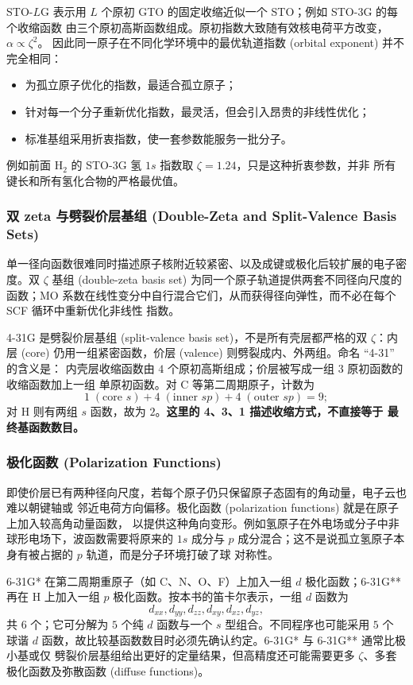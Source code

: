 \documentclass[fontset=none,12pt,a4paper]{ctexart}
\numberwithin{equation}{section}
\begin{document}
STO-$L$G 表示用 $L$ 个原初 GTO 的固定收缩近似一个 STO；例如 STO-3G 的每个收缩函数
由三个原初高斯函数组成。原初指数大致随有效核电荷平方改变，$\alpha\propto\zeta^2$。
因此同一原子在不同化学环境中的最优轨道指数 (orbital exponent) 并不完全相同：
\begin{itemize}
  \item 为孤立原子优化的指数，最适合孤立原子；
  \item 针对每一个分子重新优化指数，最灵活，但会引入昂贵的非线性优化；
  \item 标准基组采用折衷指数，使一套参数能服务一批分子。
\end{itemize}
例如前面 $\mathrm{H_2}$ 的 STO-3G 氢 $1s$ 指数取 $\zeta=1.24$，只是这种折衷参数，并非
所有键长和所有氢化合物的严格最优值。

\subsubsection{双 zeta 与劈裂价层基组 (Double-Zeta and Split-Valence Basis Sets)}

单一径向函数很难同时描述原子核附近较紧密、以及成键或极化后较扩展的电子密度。双
$\zeta$ 基组 (double-zeta basis set) 为同一个原子轨道提供两套不同径向尺度的函数；MO
系数在线性变分中自行混合它们，从而获得径向弹性，而不必在每个 SCF 循环中重新优化非线性
指数。

4-31G 是劈裂价层基组 (split-valence basis set)，不是所有壳层都严格的双 $\zeta$：内层
(core) 仍用一组紧密函数，价层 (valence) 则劈裂成内、外两组。命名 ``4-31'' 的含义是：
内壳层收缩函数由 $4$ 个原初高斯组成；价层被写成一组 $3$ 原初函数的收缩函数加上一组
单原初函数。对 C 等第二周期原子，计数为
\[
  1\;(\text{core }s)+4\;(\text{inner }sp)+4\;(\text{outer }sp)=9;
\]
对 H 则有两组 $s$ 函数，故为 $2$。\textbf{这里的 4、3、1 描述收缩方式，不直接等于
最终基函数数目。}

\subsubsection{极化函数 (Polarization Functions)}

即使价层已有两种径向尺度，若每个原子仍只保留原子态固有的角动量，电子云也难以朝键轴或
邻近电荷方向偏移。极化函数 (polarization functions) 就是在原子上加入较高角动量函数，
以提供这种角向变形。例如氢原子在外电场或分子中非球形电场下，波函数需要将原来的 $1s$
成分与 $p$ 成分混合；这不是说孤立氢原子本身有被占据的 $p$ 轨道，而是分子环境打破了球
对称性。

6-31G* 在第二周期重原子（如 C、N、O、F）上加入一组 $d$ 极化函数；6-31G** 再在 H
上加入一组 $p$ 极化函数。按本书的笛卡尔表示，一组 $d$ 函数为
\[
  d_{xx},d_{yy},d_{zz},d_{xy},d_{xz},d_{yz},
\]
共 $6$ 个；它可分解为 $5$ 个纯 $d$ 函数与一个 $s$ 型组合。不同程序也可能采用 $5$ 个
球谐 $d$ 函数，故比较基函数数目时必须先确认约定。6-31G* 与 6-31G** 通常比极小基或仅
劈裂价层基组给出更好的定量结果，但高精度还可能需要更多 $\zeta$、多套极化函数及弥散函数
(diffuse functions)。
\end{document}
